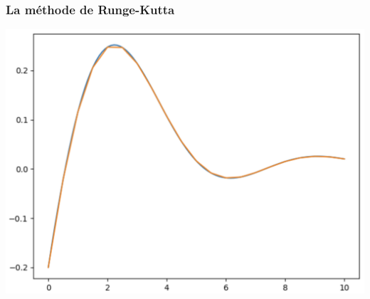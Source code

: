 \documentclass{beamer}
\begin{document}
 
 \begin{frame}
 \frametitle{La méthode de Runge-Kutta}
\begin{center}
\includegraphics[scale=0.35]{CaptureEquadiff07.png} 
\end{center}

 \end{frame}
 
\end{document}
